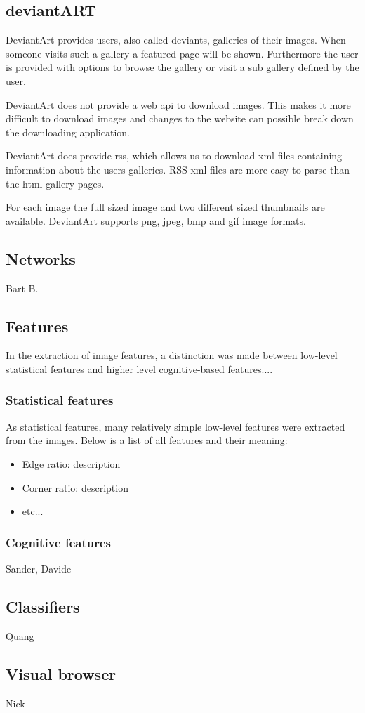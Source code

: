 \subsection{deviantART}
DeviantArt provides users, also called deviants, galleries of their images. 
When someone visits such a gallery a featured page will be shown. Furthermore
the user is provided with options to browse the gallery or visit a sub gallery
defined by the user.

DeviantArt does not provide a web api to download images. This makes it more 
difficult to download images and changes to the website can possible break
down the downloading application.

DeviantArt does provide rss, which allows us to download xml files containing 
information about the users galleries. RSS xml files are more easy to parse
than the html gallery pages.

For each image the full sized image and two different sized thumbnails are 
available. DeviantArt supports png, jpeg, bmp and gif image formats.

\subsection{Networks}
Bart B.

\subsection{Features}
In the extraction of image features, a distinction was made between low-level statistical features and higher level cognitive-based features....

\subsubsection{Statistical features}
As statistical features, many relatively simple low-level features were extracted from the images. Below is a list of all features and their meaning:
\begin{itemize}
\item Edge ratio: description
\item Corner ratio: description
\item etc...
\end{itemize}
\subsubsection{Cognitive features}
Sander, Davide

\subsection{Classifiers}
Quang

\subsection{Visual browser}
Nick

